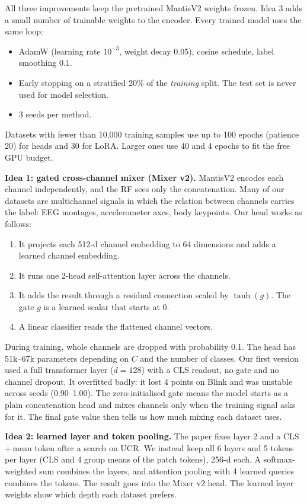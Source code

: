 \documentclass[conference]{IEEEtran}
\begin{document}
All three improvements keep the pretrained MantisV2 weights frozen. Idea 3 adds a small number of trainable weights
to the encoder. Every trained model uses the same loop:
\begin{itemize}
\item AdamW (learning rate $10^{-3}$, weight decay 0.05), cosine schedule, label smoothing 0.1.
\item Early stopping on a stratified 20\% of the \emph{training} split. The test set is never used for model
selection.
\item 3 seeds per method.
\end{itemize}
Datasets with fewer than 10,000 training samples use up to 100 epochs (patience 20) for heads and 30 for LoRA. Larger
ones use 40 and 4 epochs to fit the free GPU budget.

\textbf{Idea 1: gated cross-channel mixer (Mixer v2).} MantisV2 encodes each channel independently, and the RF sees
only the concatenation. Many of our datasets are multichannel signals in which the relation between channels carries
the label: EEG montages, accelerometer axes, body keypoints. Our head works as follows:
\begin{enumerate}
\item It projects each 512-d channel embedding to 64 dimensions and adds a learned channel embedding.
\item It runs one 2-head self-attention layer across the channels.
\item It adds the result through a residual connection scaled by $\tanh(g)$. The gate $g$ is a learned scalar that
starts at 0.
\item A linear classifier reads the flattened channel vectors.
\end{enumerate}
During training, whole channels are dropped with probability 0.1. The head has 51k--67k parameters depending on $C$
and the number of classes. Our first version used a full transformer layer ($d=128$) with a CLS readout, no gate and no channel dropout. It
overfitted badly:
it lost 4 points on Blink and was unstable across seeds (0.90--1.00). The zero-initialised gate means the model starts
as a plain concatenation head and mixes channels only when the training signal asks for it. The final gate value then
tells us how much mixing each dataset uses.

\textbf{Idea 2: learned layer and token pooling.} The paper fixes layer 2 and a CLS\,+\,mean token after a search on
UCR. We instead keep all 6 layers and 5 tokens per layer (CLS and 4 group means of the patch tokens), 256-d each. A
softmax-weighted sum combines the layers, and attention pooling with 4 learned queries combines the tokens. The
result goes into the Mixer v2 head. The learned layer weights show which depth each dataset prefers.
\end{document}
